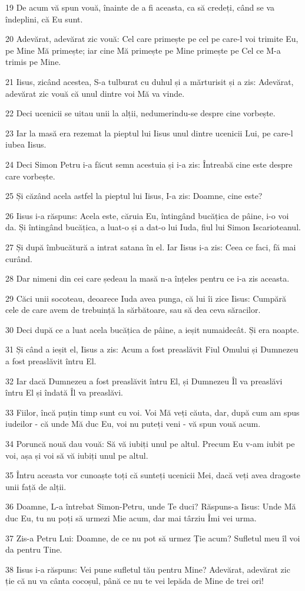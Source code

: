 \par 19 De acum vă spun vouă, înainte de a fi aceasta, ca să credeți, când se va îndeplini, că Eu sunt.
\par 20 Adevărat, adevărat zic vouă: Cel care primește pe cel pe care-l voi trimite Eu, pe Mine Mă primește; iar cine Mă primește pe Mine primește pe Cel ce M-a trimis pe Mine.
\par 21 Iisus, zicând acestea, S-a tulburat cu duhul și a mărturisit și a zis: Adevărat, adevărat zic vouă că unul dintre voi Mă va vinde.
\par 22 Deci ucenicii se uitau unii la alții, nedumerindu-se despre cine vorbește.
\par 23 Iar la masă era rezemat la pieptul lui Iisus unul dintre ucenicii Lui, pe care-l iubea Iisus.
\par 24 Deci Simon Petru i-a făcut semn acestuia și i-a zis: Întreabă cine este despre care vorbește.
\par 25 Și căzând acela astfel la pieptul lui Iisus, I-a zis: Doamne, cine este?
\par 26 Iisus i-a răspuns: Acela este, căruia Eu, întingând bucățica de pâine, i-o voi da. Și întingând bucățica, a luat-o și a dat-o lui Iuda, fiul lui Simon Iscarioteanul.
\par 27 Și după îmbucătură a intrat satana în el. Iar Iisus i-a zis: Ceea ce faci, fă mai curând.
\par 28 Dar nimeni din cei care ședeau la masă n-a înțeles pentru ce i-a zis aceasta.
\par 29 Căci unii socoteau, deoarece Iuda avea punga, că lui îi zice Iisus: Cumpără cele de care avem de trebuință la sărbătoare, sau să dea ceva săracilor.
\par 30 Deci după ce a luat acela bucățica de pâine, a ieșit numaidecât. Și era noapte.
\par 31 Și când a ieșit el, Iisus a zis: Acum a fost preaslăvit Fiul Omului și Dumnezeu a fost preaslăvit întru El.
\par 32 Iar dacă Dumnezeu a fost preaslăvit întru El, și Dumnezeu Îl va preaslăvi întru El și îndată Îl va preaslăvi.
\par 33 Fiilor, încă puțin timp sunt cu voi. Voi Mă veți căuta, dar, după cum am spus iudeilor - că unde Mă duc Eu, voi nu puteți veni - vă spun vouă acum.
\par 34 Poruncă nouă dau vouă: Să vă iubiți unul pe altul. Precum Eu v-am iubit pe voi, așa și voi să vă iubiți unul pe altul.
\par 35 Întru aceasta vor cunoaște toți că sunteți ucenicii Mei, dacă veți avea dragoste unii față de alții.
\par 36 Doamne, L-a întrebat Simon-Petru, unde Te duci? Răspuns-a Iisus: Unde Mă duc Eu, tu nu poți să urmezi Mie acum, dar mai târziu Îmi vei urma.
\par 37 Zis-a Petru Lui: Doamne, de ce nu pot să urmez Ție acum? Sufletul meu îl voi da pentru Tine.
\par 38 Iisus i-a răspuns: Vei pune sufletul tău pentru Mine? Adevărat, adevărat zic ție că nu va cânta cocoșul, până ce nu te vei lepăda de Mine de trei ori!

